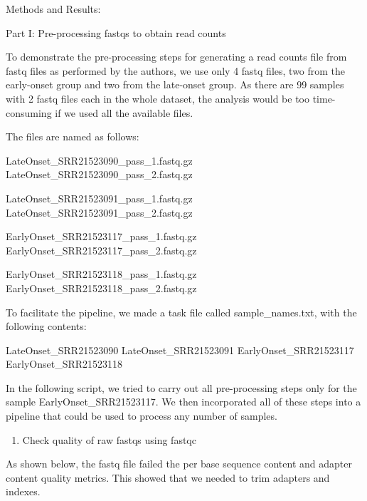 \documentclass[
]{article}
\newenvironment{Shaded}{\begin{snugshade}}{\end{snugshade}}
\newcommand{\AttributeTok}[1]{\textcolor[rgb]{0.77,0.63,0.00}{#1}}
\newcommand{\ExtensionTok}[1]{#1}
\newcommand{\NormalTok}[1]{#1}
\newcommand{\OperatorTok}[1]{\textcolor[rgb]{0.81,0.36,0.00}{\textbf{#1}}}
\newcommand{\StringTok}[1]{\textcolor[rgb]{0.31,0.60,0.02}{#1}}
\newcommand{\VariableTok}[1]{\textcolor[rgb]{0.00,0.00,0.00}{#1}}
\providecommand{\tightlist}{%
  \setlength{\itemsep}{0pt}\setlength{\parskip}{0pt}}
\begin{document}
Methods and Results:

Part I: Pre-processing fastqs to obtain read counts

To demonstrate the pre-processing steps for generating a read counts
file from fastq files as performed by the authors, we use only 4 fastq
files, two from the early-onset group and two from the late-onset group.
As there are 99 samples with 2 fastq files each in the whole dataset,
the analysis would be too time-consuming if we used all the available
files.

The files are named as follows:

LateOnset\_SRR21523090\_pass\_1.fastq.gz
LateOnset\_SRR21523090\_pass\_2.fastq.gz

LateOnset\_SRR21523091\_pass\_1.fastq.gz
LateOnset\_SRR21523091\_pass\_2.fastq.gz

EarlyOnset\_SRR21523117\_pass\_1.fastq.gz
EarlyOnset\_SRR21523117\_pass\_2.fastq.gz

EarlyOnset\_SRR21523118\_pass\_1.fastq.gz
EarlyOnset\_SRR21523118\_pass\_2.fastq.gz

To facilitate the pipeline, we made a task file called
sample\_names.txt, with the following contents:

LateOnset\_SRR21523090 LateOnset\_SRR21523091 EarlyOnset\_SRR21523117
EarlyOnset\_SRR21523118

In the following script, we tried to carry out all pre-processing steps
only for the sample EarlyOnset\_SRR21523117. We then incorporated all of
these steps into a pipeline that could be used to process any number of
samples.

\begin{enumerate}
\def\labelenumi{\arabic{enumi}.}
\tightlist
\item
  Check quality of raw fastqs using fastqc
\end{enumerate}

\begin{Shaded}
\end{Shaded}

As shown below, the fastq file failed the per base sequence content and
adapter content quality metrics. This showed that we needed to trim
adapters and indexes.
\end{document}
